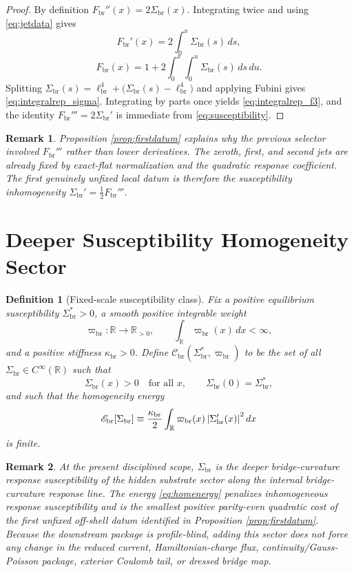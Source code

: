 \documentclass[11pt]{article}
\newcommand{\CurvScale}{\ell_{\mathrm{br}}}
\newcommand{\CurvProfile}{F_{\mathrm{br}}}
\newcommand{\ProfWeight}{\varpi_{\mathrm{br}}}
\newcommand{\RespSus}{\Sigma_{\mathrm{br}}}
\newcommand{\RespSusEq}{\Sigma_{\mathrm{br}}^{\ast}}
\newcommand{\RespClass}{\mathscr C_{\mathrm{br}}}
\newcommand{\RespEnergy}{\mathscr E_{\mathrm{br}}}
\newcommand{\RespStiff}{\kappa_{\mathrm{br}}}
\newtheorem{definition}{Definition}
\newtheorem{remark}{Remark}
\begin{document}
\begin{proof}
By definition \(\CurvProfile''(x)=2\RespSus(x)\). Integrating twice and using \eqref{eq:jetdata} gives
\[
\CurvProfile'(x)=2\int_0^x\RespSus(s)\,ds,
\]
\[
\CurvProfile(x)=1+2\int_0^x\int_0^u \RespSus(s)\,ds\,du.
\]
Splitting \(\RespSus(s)=\CurvScale^4+\bigl(\RespSus(s)-\CurvScale^4\bigr)\) and applying Fubini gives \eqref{eq:integralrep_sigma}. Integrating by parts once yields \eqref{eq:integralrep_f3}, and the identity \(\CurvProfile'''=2\RespSus'\) is immediate from \eqref{eq:susceptibility}.
\end{proof}

\begin{remark}
Proposition \ref{prop:firstdatum} explains why the previous selector involved \(\CurvProfile'''\) rather than lower derivatives. The zeroth, first, and second jets are already fixed by exact-flat normalization and the quadratic response coefficient. The first genuinely unfixed local datum is therefore the susceptibility inhomogeneity \(\RespSus'=\frac12\CurvProfile'''\).
\end{remark}

\section{Deeper Susceptibility Homogeneity Sector}

\begin{definition}[Fixed-scale susceptibility class]
\label{def:respclass}
Fix a positive equilibrium susceptibility \(\RespSusEq>0\), a smooth positive integrable weight
\begin{equation}
\ProfWeight:\mathbb R\to\mathbb R_{>0},
\qquad
\int_{\mathbb R}\ProfWeight(x)\,dx<\infty,
\label{eq:weight}
\end{equation}
and a positive stiffness \(\RespStiff>0\). Define \(\RespClass(\RespSusEq,\ProfWeight)\) to be the set of all \(\RespSus\in C^\infty(\mathbb R)\) such that
\begin{equation}
\RespSus(x)>0\quad\text{for all }x,
\qquad
\RespSus(0)=\RespSusEq,
\label{eq:respclassdata}
\end{equation}
and such that the homogeneity energy
\begin{equation}
\RespEnergy[\RespSus]
\equiv
\frac{\RespStiff}{2}\int_{\mathbb R}\ProfWeight(x)\,\abs{\RespSus'(x)}^2\,dx
\label{eq:homenergy}
\end{equation}
is finite.
\end{definition}

\begin{remark}
At the present disciplined scope, \(\RespSus\) is the deeper bridge-curvature response susceptibility of the hidden substrate sector along the internal bridge-curvature response line. The energy \eqref{eq:homenergy} penalizes inhomogeneous response susceptibility and is the smallest positive parity-even quadratic cost of the first unfixed off-shell datum identified in Proposition \ref{prop:firstdatum}. Because the downstream package is profile-blind, adding this sector does not force any change in the reduced current, Hamiltonian-charge flux, continuity/Gauss-Poisson package, exterior Coulomb tail, or dressed bridge map.
\end{remark}
\end{document}
